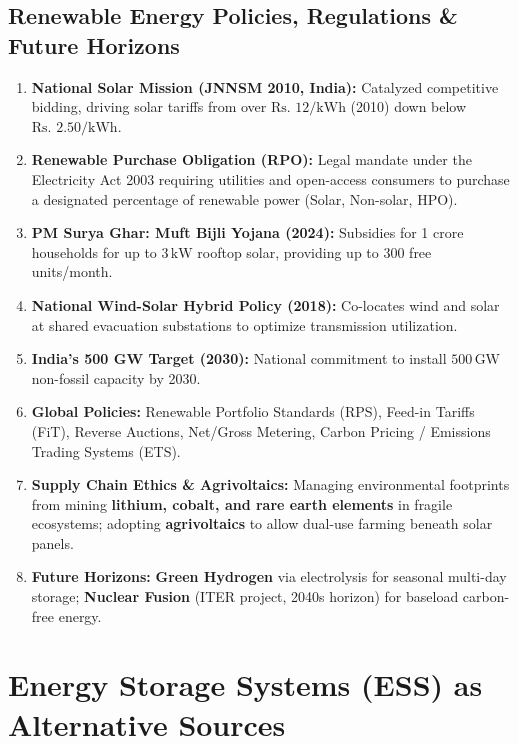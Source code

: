 \documentclass[11pt,a4paper]{article}
\begin{document}
\subsection{Renewable Energy Policies, Regulations \& Future Horizons}

\begin{enumerate}
  \item \textbf{National Solar Mission (JNNSM 2010, India):} Catalyzed competitive bidding, driving solar tariffs from over $\text{Rs. } 12/\text{kWh}$ (2010) down below $\text{Rs. } 2.50/\text{kWh}$.
  \item \textbf{Renewable Purchase Obligation (RPO):} Legal mandate under the Electricity Act 2003 requiring utilities and open-access consumers to purchase a designated percentage of renewable power (Solar, Non-solar, HPO).
  \item \textbf{PM Surya Ghar: Muft Bijli Yojana (2024):} Subsidies for 1 crore households for up to $3\,\text{kW}$ rooftop solar, providing up to 300 free units/month.
  \item \textbf{National Wind-Solar Hybrid Policy (2018):} Co-locates wind and solar at shared evacuation substations to optimize transmission utilization.
  \item \textbf{India's 500 GW Target (2030):} National commitment to install $500\,\text{GW}$ non-fossil capacity by 2030.
  \item \textbf{Global Policies:} Renewable Portfolio Standards (RPS), Feed-in Tariffs (FiT), Reverse Auctions, Net/Gross Metering, Carbon Pricing / Emissions Trading Systems (ETS).
  \item \textbf{Supply Chain Ethics \& Agrivoltaics:} Managing environmental footprints from mining \textbf{lithium, cobalt, and rare earth elements} in fragile ecosystems; adopting \textbf{agrivoltaics} to allow dual-use farming beneath solar panels.
  \item \textbf{Future Horizons:} \textbf{Green Hydrogen} via electrolysis for seasonal multi-day storage; \textbf{Nuclear Fusion} (ITER project, 2040s horizon) for baseload carbon-free energy.
\end{enumerate}

\clearpage
\section{Energy Storage Systems (ESS) as Alternative Sources}
\end{document}
